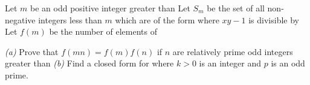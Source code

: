 Let $m$ be an odd positive integer greater than  Let $S_m$ be the set of all non-negative integers less than $m$ which are of the form  where $xy-1$ is divisible by  Let $f(m)$ be the number of elements of 

\textit{(a)} Prove that $f(mn)=f(m)f(n)$ if  $n$ are relatively prime odd integers greater than 
\textit{(b)} Find a closed form for  where $k>0$ is an integer and $p$ is an odd prime.